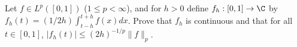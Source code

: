 Let $f\in L^p([0,1])$ ($1\leq p<\infty$), and for $h>0$ define
$f_h:[0,1]\rightarrow \C$ by
$f_h(t)=(1/2h)\int_{t-h}^{t+h}f(x)dx$. Prove that $f_h$ is continuous
and that for all $t\in [0,1]$, $|f_h(t)|\leq (2h)^{-1/p}\|f\|_p$.
